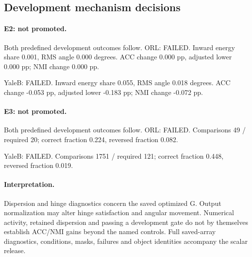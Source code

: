 \subsection{Development mechanism decisions}
\paragraph{E2: not promoted.} Both predefined development outcomes follow.
ORL: FAILED. Inward energy share 0.001, RMS angle 0.000 degrees. ACC change 0.000 pp, adjusted lower 0.000 pp; NMI change 0.000 pp. \par
YaleB: FAILED. Inward energy share 0.055, RMS angle 0.018 degrees. ACC change -0.053 pp, adjusted lower -0.183 pp; NMI change -0.072 pp. \par
\paragraph{E3: not promoted.} Both predefined development outcomes follow.
ORL: FAILED. Comparisons 49 / required 20; correct fraction 0.224, reversed fraction 0.082. \par
YaleB: FAILED. Comparisons 1751 / required 121; correct fraction 0.448, reversed fraction 0.019. \par
\paragraph{Interpretation.} Dispersion and hinge diagnostics concern the saved optimized G. Output normalization may alter hinge satisfaction and angular movement. Numerical activity, retained dispersion and passing a development gate do not by themselves establish ACC/NMI gains beyond the named controls. Full saved-array diagnostics, conditions, masks, failures and object identities accompany the scalar release.

